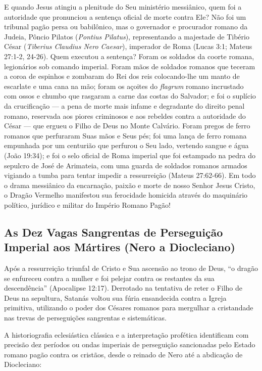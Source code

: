 \documentclass[11pt,a4paper,openany]{book}
\begin{document}
E quando Jesus atingiu a plenitude do Seu ministério messiânico, quem foi a autoridade que pronunciou a sentença oficial de morte contra Ele?
Não foi um tribunal pagão persa ou babilônico, mas o governador e procurador romano da Judeia, Pôncio Pilatos (\textit{Pontius Pilatus}), representando a majestade de Tibério César (\textit{Tiberius Claudius Nero Caesar}), imperador de Roma (Lucas 3:1; Mateus 27:1-2, 24-26).
Quem executou a sentença? Foram os soldados da coorte romana, legionários sob comando imperial. Foram mãos de soldados romanos que teceram a coroa de espinhos e zombaram do Rei dos reis colocando-lhe um manto de escarlate e uma cana na mão; foram os açoites do \textit{flagrum} romano incrustado com ossos e chumbo que rasgaram a carne das costas do Salvador; e foi o suplício da crucificação — a pena de morte mais infame e degradante do direito penal romano, reservada aos piores criminosos e aos rebeldes contra a autoridade do César — que ergueu o Filho de Deus no Monte Calvário.
Foram pregos de ferro romanos que perfuraram Suas mãos e Seus pés; foi uma lança de ferro romana empunhada por um centurião que perfurou o Seu lado, vertendo sangue e água (João 19:34); e foi o selo oficial de Roma imperial que foi estampado na pedra do sepulcro de José de Arimateia, com uma guarda de soldados romanos armados vigiando a tumba para tentar impedir a ressurreição (Mateus 27:62-66). Em todo o drama messiânico da encarnação, paixão e morte de nosso Senhor Jesus Cristo, o Dragão Vermelho manifestou sua ferocidade homicida através do maquinário político, jurídico e militar do Império Romano Pagão!


\subsection{As Dez Vagas Sangrentas de Perseguição Imperial aos Mártires (Nero a Diocleciano)}


Após a ressurreição triunfal de Cristo e Sua ascensão ao trono de Deus, ``o dragão se enfureceu contra a mulher e foi pelejar contra os restantes da sua descendência'' (Apocalipse 12:17). Derrotado na tentativa de reter o Filho de Deus na sepultura, Satanás voltou sua fúria ensandecida contra a Igreja primitiva, utilizando o poder dos Césares romanos para mergulhar a cristandade nas trevas de perseguições sangrentas e sistemáticas.

A historiografia eclesiástica clássica e a interpretação profética identificam com precisão dez períodos ou ondas imperiais de perseguição sancionadas pelo Estado romano pagão contra os cristãos, desde o reinado de Nero até a abdicação de Diocleciano:
\end{document}
